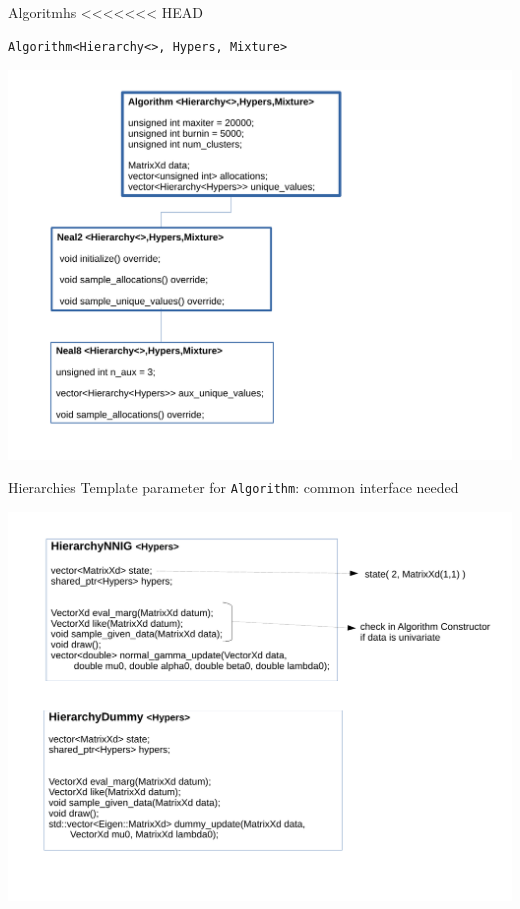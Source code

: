 

\begin{frame}[fragile]{Algoritmhs}
<<<<<<< HEAD
\begin{verbatim}
Algorithm<Hierarchy<>, Hypers, Mixture>
\end{verbatim}

\begin{center}
	\includegraphics[scale=0.35]{etc/algo.pdf}
\end{center}
\end{frame}

\begin{frame}{Hierarchies}
Template parameter for \texttt{Algorithm}: common interface needed
\begin{center}
	\includegraphics[scale=0.35]{etc/hierarchy.pdf}
\end{center}

\end{frame}

